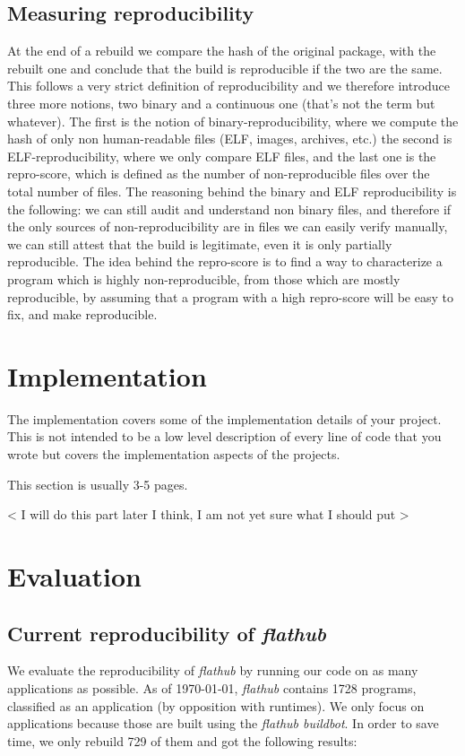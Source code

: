 \documentclass[a4paper,11pt,oneside]{report}
\theoremstyle{definition}
\newcommand{\fh}{\emph{flathub}\xspace}
\newcommand{\fhbb}{\emph{flathub buildbot}\xspace}
\begin{document}
\section{Measuring reproducibility}
At the end of a rebuild we compare the hash of the original package, with the
rebuilt one and conclude that the build is reproducible if the two are the
same. This follows a very strict definition of reproducibility and we therefore
introduce three more notions, two binary and a continuous one (that's not the
term but whatever). The first is the notion of binary-reproducibility, where we
compute the hash of only non human-readable files (ELF, images, archives, etc.)
the second is ELF-reproducibility, where we only compare ELF files, and the
last one is the repro-score, which is defined as the number of non-reproducible
files over the total number of files.
The reasoning behind the binary and ELF reproducibility is the following: we
can still audit and understand non binary files, and therefore if the only
sources of non-reproducibility are in files we can easily verify manually, we
can still attest that the build is legitimate, even it is only partially
reproducible.
The idea behind the repro-score is to find a way to characterize a program
which is highly non-reproducible, from those which are mostly reproducible, by
assuming that a program with a high repro-score will be easy to fix, and make
reproducible.


\chapter{Implementation}

The implementation covers some of the implementation details of your project.
This is not intended to be a low level description of every line of code that
you wrote but covers the implementation aspects of the projects.

This section is usually 3-5 pages.

< I will do this part later I think, I am not yet sure what I should put >

\chapter{Evaluation}

\section{Current reproducibility of \fh}
We evaluate the reproducibility of \fh by running our code on as many
applications as possible. As of \today, \fh contains 1728 programs, classified
as an application (by opposition with runtimes). We only focus on applications
because those are built using the \fhbb. In order to save time, we only rebuild
729 of them and got the following results:
\end{document}
